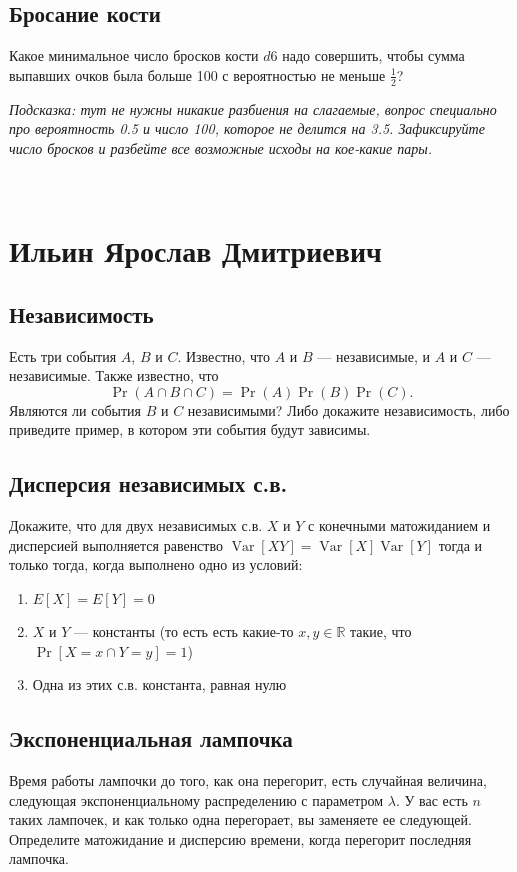 \documentclass[12pt]{article}
\newcommand\R{\mathbb{R}}
\DeclareMathOperator{\Var}{Var}
\begin{document}
\subsection{Бросание кости}
Какое минимальное число бросков кости $d6$ надо совершить, чтобы сумма выпавших очков была больше 100 с вероятностью не меньше $\frac{1}{2}$? 

\emph{Подсказка: тут не нужны никакие разбиения на слагаемые, вопрос специально про вероятность 0.5 и число 100, которое не делится на 3.5. Зафиксируйте число бросков и разбейте все возможные исходы на кое-какие пары.}

\newpage
~
\newpage
\section{Ильин Ярослав Дмитриевич}

\subsection{Независимость}
Есть три события $A$, $B$ и $C$. Известно, что $A$ и $B$ --- независимые, и $A$ и $C$ --- независимые. Также известно, что \[\Pr(A \cap B \cap C) = \Pr(A)\Pr(B)\Pr(C).\] Являются ли события $B$ и $C$ независимыми? Либо докажите независимость, либо приведите пример, в котором эти события будут зависимы.

\subsection{Дисперсия независимых с.в.}
Докажите, что для двух независимых с.в. $X$ и $Y$ с конечными матожиданием и дисперсией выполняется равенство $\Var[XY] = \Var[X]\Var[Y]$ тогда и только тогда, когда выполнено одно из условий:
\begin{enumerate}
    \item $E[X] = E[Y] = 0$
    \item $X$ и $Y$ --- константы (то есть есть какие-то $x, y \in \R$ такие, что $\Pr[X = x \cap Y = y] = 1$)
    \item Одна из этих с.в. константа, равная нулю
\end{enumerate}

\subsection{Экспоненциальная лампочка}
Время работы лампочки до того, как она перегорит, есть случайная величина, следующая экспоненциальному распределению с параметром $\lambda$. У вас есть $n$ таких лампочек, и как только одна перегорает, вы заменяете ее следующей. Определите матожидание и дисперсию времени, когда перегорит последняя лампочка.
\end{document}
